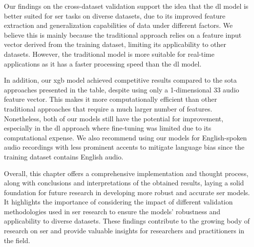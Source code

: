 Our findings on the cross-dataset validation support the idea that the \ac{dl} model is better suited for \ac{ser} tasks on diverse datasets, due to its improved feature extraction and generalization capabilities of data under different factors. We believe this is mainly because the traditional approach relies on a feature input vector derived from the training dataset, limiting its applicability to other datasets. However, the traditional model is more suitable for real-time applications as it has a faster processing speed than the \ac{dl} model.

In addition, our \ac{xgb} model achieved competitive results compared to the \ac{sota} approaches presented in the table, despite using only a 1-dimensional 33 audio feature vector. This makes it more computationally efficient than other traditional approaches that require a much larger number of features. Nonetheless, both of our models still have the potential for improvement, especially in the \ac{dl} approach where fine-tuning was limited due to its computational expense. We also recommend using our models for English-spoken audio recordings with less prominent accents to mitigate language bias since the training dataset contains English audio.

Overall, this chapter offers a comprehensive implementation and thought process, along with conclusions and interpretations of the obtained results, laying a solid foundation for future research in developing more robust and accurate \ac{ser} models. It highlights the importance of considering the impact of different validation methodologies used in \ac{ser} research to ensure the models' robustness and applicability to diverse datasets. These findings contribute to the growing body of research on \ac{ser} and provide valuable insights for researchers and practitioners in the field.
